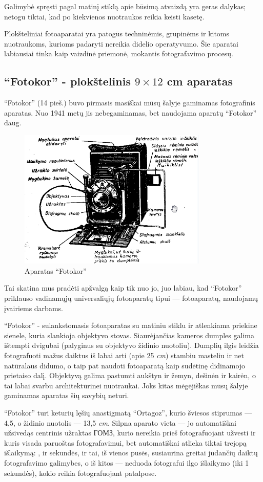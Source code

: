 \documentclass{book}
\begin{document}
			Galimybė spręsti pagal matinį stiklą apie būsimą atvaizdą yra geras dalykas; netogu tiktai, kad po kiekvienos nuotraukos reikia keisti kasetę.

			Plokšteliniai fotoaparatai yra patogūs techninėmis, grupinėms ir kitoms nuotraukoms, kurioms padaryti nereikia didelio operatyvumo. Šie aparatai labiausiai tinka kaip vaizdinė priemonė, mokantis fotografavimo procesų.
		\subsection*{``Fotokor'' - plokštelinis $9 \times 12$ cm aparatas}
			``Fotokor'' (14 pieš.) buvo pirmasis masiškai mūsų šalyje gaminamas fotografinis aparatas. Nuo 1941 metų jis nebegaminamas, bet naudojama aparatų ``Fotokor'' daug.
			\begin{figure}[h]
				\centering
				\includegraphics[width=0.8\textwidth]{14-pav}
				\caption{Aparatas ``Fotokor''}
				\label{fig:14}
			\end{figure} 
			Tai skatina mus pradėti apžvalgą kaip tik nuo jo, juo labiau, kad ``Fotokor'' priklauso vadinamųjų universaliųjų fotoaparatų tipui --- fotoaparatų, naudojamų įvairiems darbams.

			``Fotokor'' - sulankstomasis fotoaparatas su matiniu stiklu ir atlenkiama priekine sienele, kuria slankioja objektyvo stovas. Siaurėjančias kameros dumples galima ištempti dvigubai (palyginus su objektyvo židinio nuotoliu). Dumplių ilgis leidžia fotografuoti mažus daiktus iš labai arti (apie 25 \textit{cm}) stambiu masteliu ir net natūralaus didumo, o taip pat naudoti fotoaparatą kaip sudėtinę didinamojo prietaiso dalį. Objektyvą galima pastumti aukštyn ir žemyn, dešinėn ir kairėn, o tai labai svarbu architektūrinei nuotraukai. Joks kitas mėgėjiškas mūsų šalyje gaminamas aparatas šių savybių neturi.

			``Fotokor'' turi keturių lęšių anastigmatą ``Ortagoz'', kurio šviesos stiprumas --- 4,5, o židinio nuotolis --- 13,5 \textit{cm}. Silpna aparato vieta --- jo automatiškai užsivedąs centrinis užraktas \foreignlanguage{russian}{ГОМЗ}, kurio nereikia prieš fotografuojant užvesti ir kuris visada paruoštas fotografavimui, bet automatiškai atlieka tiktai trejopą išlaikymą: ,  ir  sekundės, ir tai, iš vienos pusės, susiaurina greitai judančių daiktų fotografavimo galimybes, o iš kitos --- neduoda fotografui ilgo išlaikymo (iki 1 sekundės), kokio reikia fotografuojant patalpose.
\end{document}

